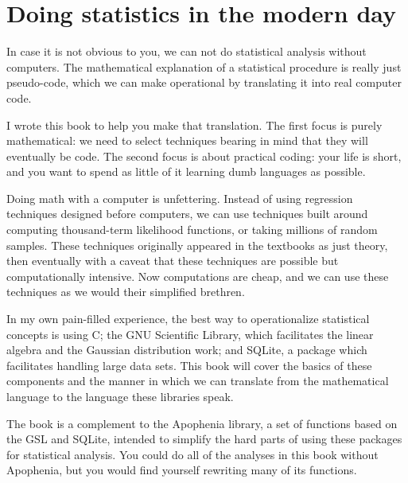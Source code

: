 \documentclass[12pt,notitlepage, openany]{book}
\begin{document}
\setcounter{tocdepth}{1}
\tableofcontents
\mainmatter\chapter[Introduction]{Doing statistics in the modern day}
\iftwocol\begin{multicols}{2}\fi


In case it is not obvious to you, we can not do statistical analysis without
computers. The mathematical explanation of a statistical procedure is
really just pseudo-code, which we can make operational by translating
it into real computer code.

I wrote this book to help you make that translation. The first focus
is purely mathematical: we need to select techniques bearing in mind
that they will eventually be code. The second focus is about practical
coding: your life is short, and you want to spend as little of it learning
dumb languages as possible.

Doing math with a computer is unfettering. Instead of using regression
techniques designed before computers, we can use techniques built around
computing thousand-term likelihood functions, or taking millions of
random samples. These techniques originally appeared in the textbooks
as just theory, then eventually with a caveat that these techniques
are possible but computationally intensive. Now computations are cheap,
and we can use these techniques as we would their simplified brethren.

In my own pain-filled experience, the best way to operationalize
statistical concepts is using C; the GNU Scientific Library,  which
facilitates the linear algebra and the Gaussian distribution work;
and SQLite, a package which facilitates handling large data sets. This
book will cover the basics of these components and the manner in which
we can translate from the mathematical language to the language these
libraries speak.

The book is a complement to the Apophenia library, a set of functions 
based on the GSL and SQLite, intended to simplify the hard parts of
using these packages for statistical analysis. You could do all of the
analyses in this book without Apophenia, but you would find yourself
rewriting many of its functions. 


\end{multicols}
\end{document}
